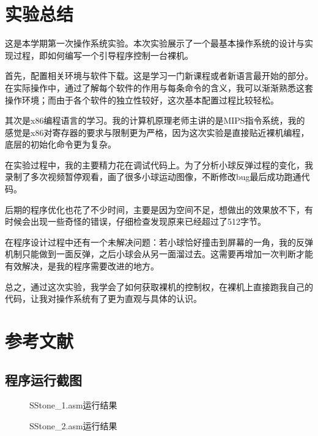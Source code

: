 \documentclass[a4paper,11pt,UTF8]{ctexart}
\begin{document}
\section{实验总结}

这是本学期第一次操作系统实验。本次实验展示了一个最基本操作系统的设计与实现过程，即如何编写一个引导程序控制一台裸机。

首先，配置相关环境与软件下载。这是学习一门新课程或者新语言最开始的部分。在实际操作中，通过了解每个软件的作用与每条命令的含义，我可以渐渐熟悉这套操作环境；而由于各个软件的独立性较好，这次基本配置过程比较轻松。

其次是x86编程语言的学习。我的计算机原理老师主讲的是MIPS指令系统，我的感觉是x86对寄存器的要求与限制更为严格，因为这次实验是直接贴近裸机编程，底层的初始化命令更为复杂。

在实验过程中，我的主要精力花在调试代码上。为了分析小球反弹过程的变化，我录制了多次视频暂停观看，画了很多小球运动图像，不断修改bug最后成功跑通代码。

后期的程序优化也花了不少时间，主要是因为空间不足，想做出的效果放不下，有时候会出现一些奇怪的错误，仔细检查发现原来已经超过了512字节。

在程序设计过程中还有一个未解决问题：若小球恰好撞击到屏幕的一角，我的反弹机制只能做到一面反弹，之后小球会从另一面溜过去。这需要再增加一次判断才能有效解决，是我的程序需要改进的地方。

总之，通过这次实验，我学会了如何获取裸机的控制权，在裸机上直接跑我自己的代码，让我对操作系统有了更为直观与具体的认识。


\section{参考文献}




\clearpage

\begin{appendix}

\section{程序运行截图}

	\begin{figure}[!htbp]
	\centering
	
	\subfigure[]{
		\texttt{[image: ss1\_1]}
		
	}
	\quad
	\subfigure[]{
		\texttt{[image: ss1\_2]}
	}
	\quad
	\subfigure[]{
		\texttt{[image: ss1\_3]}
	}
	\quad
	\subfigure[]{
		\texttt{[image: ss1\_4]}
	}
	\caption{SStone\_1.asm运行结果}
	\end{figure}

\begin{figure}[!htbp]
	\centering
	
	\subfigure[]{
		\texttt{[image: ss2\_1]}
		
	}
	\quad
	\subfigure[]{
		\texttt{[image: ss2\_2]}
	}
	\quad
	\subfigure[]{
		\texttt{[image: ss2\_3]}
	}
	\quad
	\subfigure[]{
		\texttt{[image: ss2\_4]}
	}
	\caption{SStone\_2.asm运行结果}
\end{figure}

\end{appendix}
\end{document}
